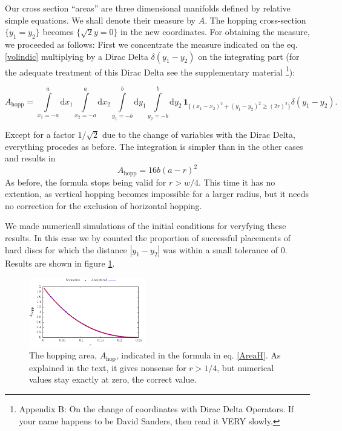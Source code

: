 \documentclass[letterpaper,10pt, jcp, aps]{revtex4-1}
\newcommand{\rd}{\!\mathrm{d}}
\newcommand{\indicator}[1]{\mathbf{1}_{ \{   #1 \} } }
\begin{document}
Our cross section ``areas'' are three dimensional manifolds
defined by relative simple equations. We shall denote their
measure by $A$.
The hopping cross-section 
$ \{y_1 = y_2\}$ becomes 
$\{ \sqrt{2}y=0 \}$ in the new coordinates.
For obtaining the measure,
we proceeded as follows:
First we concentrate the measure indicated on the eq. \ref{volindic}
multiplying by a Dirac Delta $\delta(y_1-y_2)$ on the integrating part
(for the adequate treatment of this Dirac Delta see the supplementary 
material \footnote{Appendix B: On the change of coordinates with Dirac Delta 
Operators. If your name happens to be David Sanders, then read it VERY slowly.}):
\begin{widetext}
\begin{equation}
 A_\text{hopp} = \int\limits_{x_1 = -a}^a \rd x_1 \int\limits_{x_2 = -a}^a \rd x_2 
\int\limits_{y_1 = -b}^b \rd y_1 \int\limits_{y_2 = -b}^b \rd y_2 \, \indicator{ (x_1-x_2)^2 + (y_1-y_2)^2 \ge (2r)^2 } \delta(y_1-y_2).
\end{equation}
\end{widetext}
Except for a factor $1/\sqrt{2}$ due to the change of variables
with the Dirac Delta, everything procedes as before. The integration is
simpler than in the other cases and results in 
\begin{equation}
 A_\text{hopp}  =  16 b(a-r)^2
\end{equation}
As before, the formula stops being valid for $r>w/4$. This time it has
no extention, as vertical hopping becomes impossible for a larger radius,
but it needs no correction for the exclusion of horizontal hopping. 

We made numericall simulations of the initial conditions for
veryfying these results. In this case we 
by counted the proportion of successful placements of hard discs 
for which the distance 
$|y_1 - y_2|$ was within a small tolerance of $0$. 
Results are shown in figure \ref{AreaHopp01}.

\begin{figure}[h]
\centering
\includegraphics[width=0.45\textwidth]{./FigurasPerfectas/AreaHop02.pdf}
\caption{The hopping area, $A_\text{hop}$, 
  indicated in the formula in eq. \ref{AreaH}. As explained
in the text, it gives nonsense for $r>1/4$, but numerical values stay
exactly at zero, the correct value. } 
\label{AreaHopp01}
\end{figure}
\end{document}
